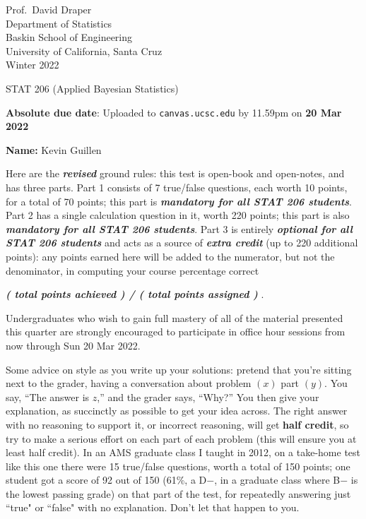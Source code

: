 \documentclass[12pt]{article}
\newcommand{\bi}[1]{\textbf{\textit{#1}}}
\begin{document}
\begin{flushleft}

Prof.~David Draper \\
Department of Statistics \\
Baskin School of Engineering \\
University of California, Santa Cruz \\
Winter 2022

\end{flushleft}

\Large

\begin{center}

STAT 206 (\textsf{Applied Bayesian Statistics})


\large

\textbf{Absolute due date}: Uploaded to \texttt{canvas.ucsc.edu} by 11.59pm on \textbf{20 Mar 2022}

\end{center}

\normalsize

\textbf{Name:} Kevin Guillen

Here are the \bi{revised} ground rules: this test is open-book and open-notes, and has three parts. Part 1 consists of 7 true/false questions, each worth 10 points, for a total of 70 points; this part is \bi{mandatory for all STAT 206 students}. Part 2 has a single calculation question in it, worth 220 points; this part is also \bi{mandatory for all STAT 206 students}. Part 3 is entirely \bi{optional for all STAT 206 students} and acts as a source of \bi{extra credit} (up to 220 additional points): any points earned here will be added to the numerator, but not the denominator, in computing your course percentage correct 

\hspace*{0.5in}\bi{( total points achieved ) / ( total points assigned )} .

Undergraduates who wish to gain full mastery of all of the material presented this quarter are strongly encouraged to participate in office hour sessions from now through Sun 20 Mar 2022.

Some advice on style as you write up your solutions: pretend that you're sitting next to the grader, having a conversation about problem $( x )$ part $( y )$. You say, ``The answer is $z$,'' and the grader says, ``Why?'' You then give your explanation, as succinctly as possible to get your idea across. The right answer with no reasoning to support it, or incorrect reasoning, will get \textbf{half credit}, so try to make a serious effort on each part of each problem (this will ensure you at least half credit). In an AMS graduate class I taught in 2012, on a take-home test like this one there were 15 true/false questions, worth a total of 150 points; one student got a score of 92 out of 150 (61\%, a D$-$, in a graduate class where B$-$ is the lowest passing grade) on that part of the test, for repeatedly answering just ``true" or ``false" with no explanation. Don't let that happen to you.  
\end{document}
